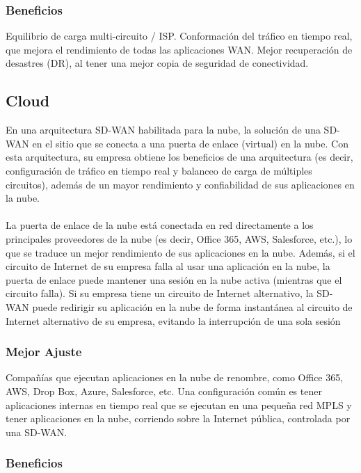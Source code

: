 \subsubsection{Beneficios}
\label{sec:Beneficios}

Equilibrio de carga multi-circuito / ISP. Conformación del tráfico en tiempo real, que mejora el rendimiento de todas las aplicaciones WAN. Mejor recuperación de desastres (DR), al tener una mejor copia de seguridad de conectividad.

\subsection{Cloud}
\label{sec:Cloud}


En una arquitectura SD-WAN habilitada para la nube, la solución de una SD-WAN en el sitio que se conecta a una puerta de enlace (virtual) en la nube. Con esta arquitectura, su empresa obtiene los beneficios de una arquitectura (es decir, configuración de tráfico en tiempo real y balanceo de carga de múltiples circuitos), además de un mayor rendimiento y confiabilidad de sus aplicaciones en la nube.
\\
\\
La puerta de enlace de la nube está conectada en red directamente a los principales proveedores de la nube (es decir, Office 365, AWS, Salesforce, etc.), lo que se traduce un mejor rendimiento de sus aplicaciones en la nube. Además, si el circuito de Internet de su empresa falla al usar una aplicación en la nube, la puerta de enlace puede mantener una sesión en la nube activa (mientras que el circuito falla). Si su empresa tiene un circuito de Internet alternativo, la SD-WAN puede redirigir su aplicación en la nube de forma instantánea al circuito de Internet alternativo de su empresa, evitando la interrupción de una sola sesión


\subsubsection{Mejor Ajuste}
\label{sec:Mejor Ajuste}

Compañías que ejecutan aplicaciones en la nube de renombre, como Office 365, AWS, Drop Box, Azure, Salesforce, etc. Una configuración común es tener aplicaciones internas en tiempo real que se ejecutan en una pequeña red MPLS y tener aplicaciones en la nube, corriendo sobre la Internet pública, controlada por una SD-WAN.

\subsubsection{Beneficios}
\label{sec:Beneficios}

